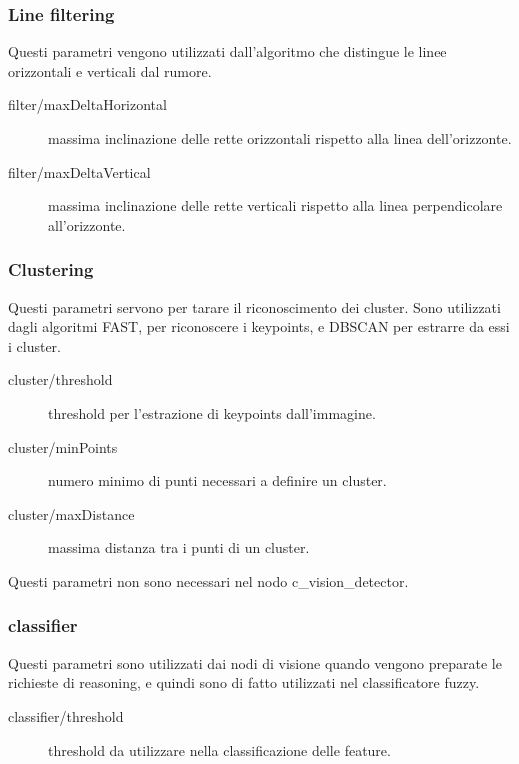 \subsubsection{Line filtering}

Questi parametri vengono utilizzati dall'algoritmo che distingue le linee orizzontali e verticali dal rumore.

\begin{description}
 \item [filter/maxDeltaHorizontal] massima inclinazione delle rette orizzontali rispetto alla linea dell'orizzonte.
 \item [filter/maxDeltaVertical] massima inclinazione delle rette verticali rispetto alla linea perpendicolare all'orizzonte.
\end{description}


\subsubsection{Clustering}

Questi parametri servono per tarare il riconoscimento dei cluster. Sono utilizzati dagli algoritmi FAST, per riconoscere i keypoints, e DBSCAN per estrarre da essi i cluster.

\begin{description}
 \item [cluster/threshold] threshold per l'estrazione di keypoints dall'immagine.
 \item [cluster/minPoints] numero minimo di punti necessari a definire un cluster.
 \item [cluster/maxDistance] massima distanza tra i punti di un cluster.
\end{description}

Questi parametri non sono necessari nel nodo c\_vision\_detector.

\subsubsection{classifier}

Questi parametri sono utilizzati dai nodi di visione quando vengono preparate le richieste di reasoning, e quindi sono di fatto utilizzati nel classificatore fuzzy.

\begin{description}
 \item [classifier/threshold] threshold da utilizzare nella classificazione delle feature.
\end{description}

